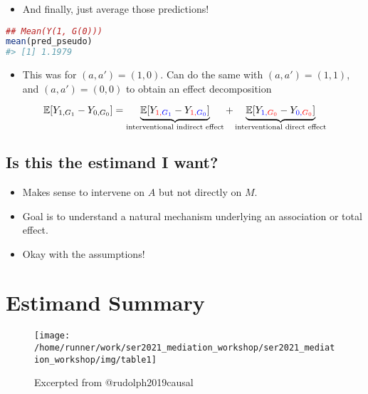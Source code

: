 \documentclass[
  12pt,
]{book}
\providecommand{\tightlist}{%
  \setlength{\itemsep}{0pt}\setlength{\parskip}{0pt}}
\theoremstyle{definition}
\theoremstyle{definition}
\theoremstyle{definition}
\newcommand{\E}{\mathbb{E}}
\newcommand{\1}{\mathbbm{1}}
\begin{document}
\begin{itemize}
\tightlist
\item
  And finally, just average those predictions!
\end{itemize}

\begin{lstlisting}[language=R]
## Mean(Y(1, G(0)))
mean(pred_pseudo)
#> [1] 1.1979
\end{lstlisting}

\begin{itemize}
\tightlist
\item
  This was for \((a,a')=(1,0)\). Can do the same with \((a,a')=(1,1)\), and
  \((a,a')=(0,0)\) to obtain an effect decomposition
\end{itemize}

\begin{equation*}
  \E[Y_{1,G_1} - Y_{0,G_0}] = \underbrace{\E[Y_{\color{red}{1},
    \color{blue}{G_1}} -
    Y_{\color{red}{1},
    \color{blue}{G_0}}]}_{\text{interventional indirect effect}} +
    \underbrace{\E[Y_{\color{blue}{1},\color{red}{G_0}} -
    Y_{\color{blue}{0},
    \color{red}{G_0}}]}_{\text{interventional direct effect}}
\end{equation*}

\hypertarget{is-this-the-estimand-i-want-2}{%
\subsection{Is this the estimand I want?}\label{is-this-the-estimand-i-want-2}}

\begin{itemize}
\tightlist
\item
  Makes sense to intervene on \(A\) but not directly on \(M\).
\item
  Goal is to understand a natural mechanism underlying an association or total
  effect.
\item
  Okay with the assumptions!
\end{itemize}

\hypertarget{estimand-summary}{%
\section{Estimand Summary}\label{estimand-summary}}

\begin{figure}

{\centering \texttt{[image: /home/runner/work/ser2021\_mediation\_workshop/ser2021\_mediation\_workshop/img/table1]} 

}

\caption{Excerpted from @rudolph2019causal}\label{fig:unnamed-chunk-21}
\end{figure}
\end{document}
